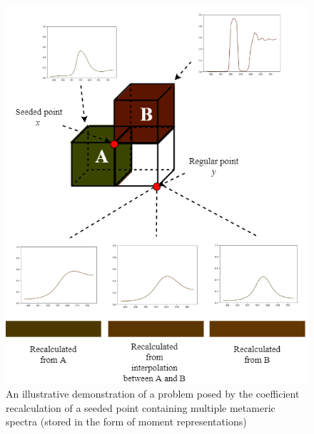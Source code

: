 \begin{figure}[t!]
	\centering
	\captionsetup[subfigure]{font=footnotesize,labelfont=footnotesize}
	\includegraphics[width=0.8\linewidth]{img/recalculation.png}
	\caption{An illustrative demonstration of a problem posed by the coefficient recalculation of a seeded point containing multiple metameric spectra (stored in the form of moment representations)}
	\label{fig:recalculation_process}
\end{figure}

